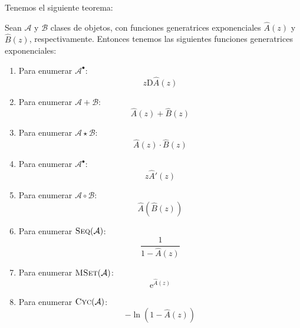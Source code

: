   Tenemos el siguiente teorema:
  \begin{theorem}
    \label{theo:ms-EGF}
    Sean \(\mathcal{A}\) y \(\mathcal{B}\) clases de objetos,
    con funciones generatrices exponenciales
    \(\widehat{A}(z)\) y \(\widehat{B}(z)\),
    respectivamente.
    Entonces tenemos
    las siguientes funciones generatrices exponenciales:
    \begin{enumerate}
    \item
      Para enumerar \(\mathcal{A}^\bullet\):
      \begin{equation*}
	z \mathrm{D} \widehat{A}(z)
      \end{equation*}
    \item
      Para enumerar \(\mathcal{A} + \mathcal{B}\):
      \begin{equation*}
	\widehat{A}(z) + \widehat{B}(z)
      \end{equation*}
    \item
      Para enumerar \(\mathcal{A} \star \mathcal{B}\):
      \begin{equation*}
	\widehat{A}(z) \cdot \widehat{B}(z)
      \end{equation*}
    \item
      Para enumerar \(\mathcal{A}^\bullet\):
      \begin{equation*}
	z \widehat{A}'(z)
      \end{equation*}
    \item
      Para enumerar \(\mathcal{A} \circ \mathcal{B}\):
      \begin{equation*}
	\widehat{A}(\widehat{B}(z))
      \end{equation*}
    \item
      Para enumerar \(\operatorname{\textsc{Seq}}(\mathcal{A})\):
      \begin{equation*}
	\frac{1}{1 - \widehat{A}(z)}
      \end{equation*}
    \item
      Para enumerar \(\operatorname{\textsc{MSet}}(\mathcal{A})\):
      \begin{equation*}
	\mathrm{e}^{\widehat{A}(z)}
      \end{equation*}
    \item
      Para enumerar \(\operatorname{\textsc{Cyc}}(\mathcal{A})\):
      \begin{equation*}
	-\ln(1 - \widehat{A}(z))
      \end{equation*}
    \end{enumerate}
  \end{theorem}
